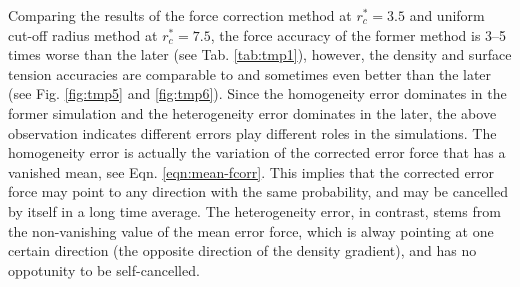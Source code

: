 \documentclass[aps,pre,preprint]{revtex4-1}
\begin{document}
Comparing the results of the force correction method at
$r_c^\ast = 3.5$ and uniform cut-off radius method at $r_c^\ast = 7.5$, the
force accuracy of the former method is 3--5 times worse than the later
(see Tab. \ref{tab:tmp1}), however, the
density and surface tension accuracies are comparable to and
sometimes even better than the later (see Fig. \ref{fig:tmp5} and
\ref{fig:tmp6}).
Since the homogeneity error dominates in the former simulation and the
heterogeneity error dominates in the later, the above observation
indicates different errors play different roles in the simulations.
The homogeneity error is actually the variation of the corrected error
force that has a vanished mean, see Eqn. \eqref{eqn:mean-fcorr}. This
implies that the corrected error force may point to any direction with
the same probability, and may be cancelled by itself in a long time
average.  The heterogeneity error, in contrast, stems from the
non-vanishing value of the mean error force, which is alway pointing
at one certain direction (the opposite direction of the density
gradient), and has no oppotunity to be self-cancelled.



\end{document}
